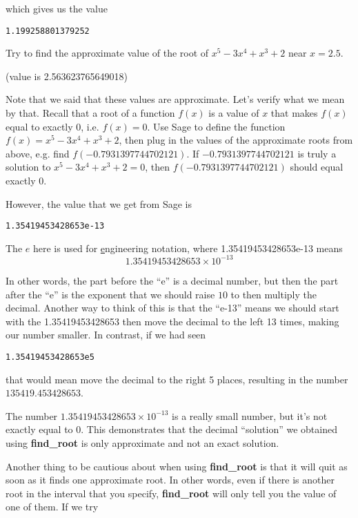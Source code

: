 \documentclass[12pt]{amsart}
\theoremstyle{definition}
\theoremstyle{definition}
\begin{document}
which gives us the value

\begin{verbatim}
1.199258801379252
\end{verbatim}

Try to find the approximate value of the root of $x^5-3x^4+x^3+2$
near $x=2.5$.

(value is 2.563623765649018)

Note that we said that these values are approximate. Let's verify
what we mean by that. Recall that a root of a function $f(x)$ is
a value of $x$ that makes $f(x)$ equal to exactly $0$, i.e.
$f(x)=0$. Use Sage to define the function $f(x)=x^5-3x^4+x^3+2$,
then plug in the values of the approximate roots from above,
e.g. find $f(-0.7931397744702121)$. If $-0.7931397744702121$
is truly a solution to $x^5-3x^4+x^3+2=0$, then
$f(-0.7931397744702121)$ should equal exactly 0.

However, the value that we get from Sage is

\begin{verbatim}
1.35419453428653e-13
\end{verbatim}

The $e$ here is used for \underline{e}ngineering notation,
where 1.35419453428653e-13 means
\begin{equation*}
1.35419453428653\times 10^{-13}
\end{equation*}

In other words, the part before the ``e'' is a decimal number,
but then the part after the ``e'' is the exponent that we should
raise $10$ to then multiply the decimal. Another way to think of
this is that the ``e-13'' means we should start with the
1.35419453428653 then move the decimal to the left 13 times,
making our number smaller. In contrast, if we had seen

\begin{verbatim}1.35419453428653e5\end{verbatim}

that would mean move the decimal to the right 5 places, resulting
in the number $135419.453428653$.

The number $1.35419453428653\times 10^{-13}$ is a really
small number, but it's not exactly equal to 0. This 
demonstrates that the decimal ``solution'' we obtained using
\textbf{find\_root} is only approximate and not an exact solution.

Another thing to be cautious about when using \textbf{find\_root}
is that it will quit as soon as it finds one approximate root. In other
words, even if there is another root in the interval that you specify,
\textbf{find\_root} will only tell you the value of one of them. If we
try
\end{document}
